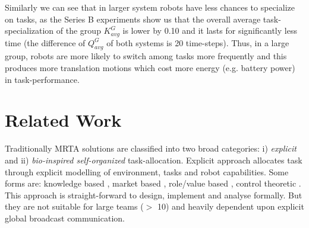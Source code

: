 \documentclass[smallcondensed]{svjour3}
\begin{document}
Similarly we can see that in larger system robots have less chances to specialize on tasks, as the Series B experiments show us that the overall average task-specialization of the group $K^G_{avg}$ is lower by 0.10 and it lasts for significantly less time (the difference of $Q^G_{avg}$  of both systems is 20 time-steps). Thus, in a large group, robots are more likely to switch among tasks more frequently and this produces more translation motions which cost more energy (e.g. battery power) in task-performance.
\section{Related Work}
\label{sec:rw}
Traditionally MRTA solutions are classified into two broad categories: i) {\em explicit} and ii) {\em bio-inspired self-organized} task-allocation.  Explicit approach allocates task through explicit modelling of environment, tasks and robot capabilities. Some forms are: knowledge based \citep{Parker1998}, market based \citep{Dias+2006}, role/value based \citep{Chaimowicz2002}, control theoretic \citep{Belta+2004}. This approach is straight-forward to design, implement and analyse formally. But they are not suitable for large teams ($>$ 10)  and heavily dependent upon explicit global broadcast communication.  
\end{document}

